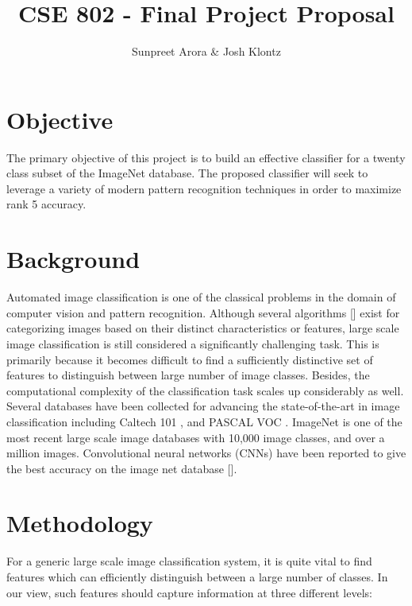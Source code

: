 \documentclass[12pt]{article}
\begin{document}
 
\title{CSE 802 - Final Project Proposal}
\author{Sunpreet Arora \& Josh Klontz\\
}
 
\maketitle

\section{Objective}
The primary objective of this project is to build an effective classifier for a twenty class subset of the ImageNet \cite{imagenet} database. 
The proposed classifier will seek to leverage a variety of modern pattern recognition techniques in order to maximize rank 5 accuracy.

\section{Background}
Automated image classification is one of the classical problems in the domain of computer vision and pattern recognition. Although several algorithms [] exist for categorizing images based on their distinct characteristics or features, large scale image classification is still considered a significantly challenging task. This is primarily because it becomes difficult to find a sufficiently distinctive set of features to distinguish between large number of image classes. Besides, the computational complexity of the classification task scales up considerably as well.\\
Several databases have been collected for advancing the state-of-the-art in image classification including Caltech 101 \cite{caltech101}, and PASCAL VOC \cite{pascal09}. ImageNet\cite{imagenet} is one of the most recent large scale image databases with 10,000 image classes, and over a million images. Convolutional neural networks (CNNs) have been reported to give the best accuracy on the image net database [].


\section{Methodology}
For a generic large scale image classification system, it is quite vital to find features which can efficiently distinguish between a large number of classes. In our view, such features should capture information at three different levels:
\end{document}
